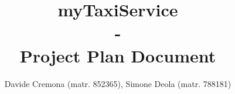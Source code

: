 \documentclass{report}
\begin{document}
\title{\textbf{myTaxiService} \\-\\ \textbf{Project Plan Document}}
\author{Davide Cremona (matr. 852365), Simone Deola (matr. 788181)}
 
\maketitle

\tableofcontents










 
\end{document}
